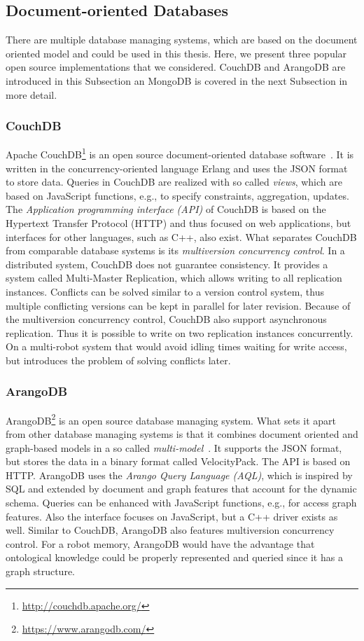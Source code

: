 \subsection{Document-oriented Databases}
\label{sec:documentdbs}
There are multiple database managing systems, which are based on the
document oriented model and could be used in this thesis. Here, we
present three popular open source implementations that we
considered. CouchDB and ArangoDB are introduced in this Subsection an
MongoDB is covered in the next Subsection in more detail.

\subsubsection{CouchDB}
\label{sec:couchdb}
Apache CouchDB\footnote{\url{http://couchdb.apache.org/}} is an open source document-oriented database
software~\cite{CouchDB,document-comparison}.
It is written in the concurrency-oriented language Erlang and
uses the JSON format to store data. Queries in CouchDB are realized with
so called \emph{views}, which are based on JavaScript functions,
e.g., to specify constraints, aggregation, updates. The
\emph{Application programming interface (API)} of
CouchDB is based on the Hypertext Transfer Protocol (HTTP) and thus focused on web applications, but
interfaces for other languages, such as C++, also exist. What
separates CouchDB from comparable database systems is its
\emph{multiversion concurrency control}. In a distributed system,
CouchDB does not guarantee consistency. It provides a system called
Multi-Master Replication, which allows writing to all replication
instances.  Conflicts can be solved similar to a version control
system, thus multiple conflicting versions can be kept in parallel for
later revision. Because of the multiversion concurrency control,
CouchDB also support asynchronous replication. Thus it is possible to
write on two replication instances concurrently. On a multi-robot
system that would avoid idling times waiting for write access, but
introduces the problem of solving conflicts later.

\subsubsection{ArangoDB}
\label{sec:arangodb}
ArangoDB\footnote{\url{https://www.arangodb.com/}} is an open source database managing system. What sets it
apart from other database managing systems is that it combines document
oriented and graph-based models in a so called
\emph{multi-model}~\cite{arango-manual,arango}. It supports the JSON
format, but stores the data in a binary format called
VelocityPack. The API is based on HTTP. ArangoDB uses the
\emph{Arango Query Language (AQL)}, which is inspired by SQL and
extended by document and graph features that account for the dynamic
schema. Queries can be enhanced with JavaScript functions, e.g., for
access graph features. Also the interface focuses on JavaScript, but
a C++ driver exists as well. Similar to CouchDB, ArangoDB also
features multiversion concurrency control. For a robot memory,
ArangoDB would have the advantage that ontological knowledge could be
properly represented and queried since it has a graph structure.

